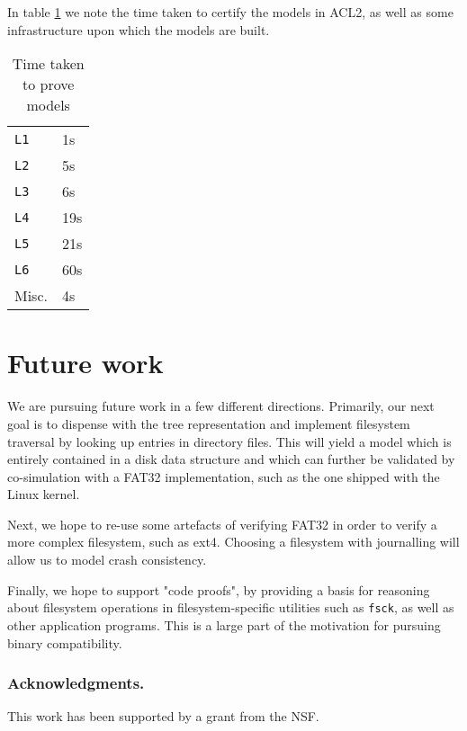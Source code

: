 \documentclass[runningheads,a4paper]{llncs}
\begin{document}
In table \ref{certification-timing-table} we note the time taken to certify
the models in ACL2, as well as some infrastructure upon which the
models are built.

\begin{table}[]
  \centering
  \caption{Time taken to prove models}
  \label{certification-timing-table}
  \begin{tabular}{ll}
    \texttt{L1} & 1s \\
    \texttt{L2} & 5s \\
    \texttt{L3} & 6s \\
    \texttt{L4} & 19s \\
    \texttt{L5} & 21s \\
    \texttt{L6} & 60s \\
    Misc. & 4s \\
  \end{tabular}
\end{table}

\section{Future work}

We are pursuing future work in a few different directions. Primarily,
our next goal is to dispense with the tree representation and
implement filesystem traversal by looking up entries in directory
files. This will yield a model which is entirely contained in a disk
data structure and which can further be validated by co-simulation
with a FAT32 implementation, such as the one shipped with the Linux
kernel.

Next, we hope to re-use some artefacts of verifying FAT32 in order to
verify a more complex filesystem, such as ext4. Choosing a filesystem
with journalling will allow us to model crash consistency.

Finally, we hope to support "code proofs", by providing a basis for
reasoning about filesystem operations in filesystem-specific utilities
such as \texttt{fsck}, as well as other application programs. This is
a large part of the motivation for pursuing binary compatibility.

\subsubsection*{Acknowledgments.} This work has been supported by a
grant from the NSF.



\end{document}
